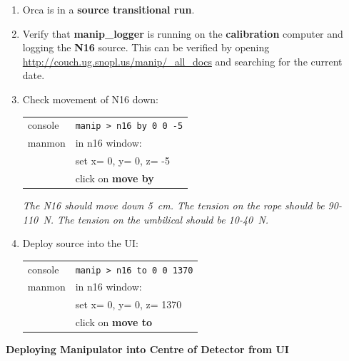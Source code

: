 \begin{enumerate}
\item \CheckBox[name=n16d12]{} Orca is in a {\bf source transitional run}.
\item \CheckBox[name=n16d13]{} Verify that {\bf manip\_logger} is running on the {\bf calibration} computer and logging the {\bf N16} source. This can be verified by opening \url{http://couch.ug.snopl.us/manip/_all_docs} and searching for the current date.
\item \CheckBox[name=n16d14]{} Check movement of N16 down:
	\begin{center}
	\begin{tabular}{|l|l|}
	\hline
	console & \verb+manip > n16 by 0 0 -5+ \\
	manmon & in n16 window: \\
	& set x= 0, y= 0, z= -5 \\
	& click on {\bf move by} \\
	\hline
	\end{tabular}
	\end{center}
{\it The N16 should move down 5~cm. The tension on the rope should be 90-110~N. The tension on the umbilical should be 10-40~N.}
\item \CheckBox[name=n16d15]{} Deploy source into the UI:
	\begin{center}
	\begin{tabular}{|l|l|}
	\hline
	console & \verb+manip > n16 to 0 0 1370+ \\
	manmon & in n16 window: \\
	& set x= 0, y= 0, z= 1370 \\
	& click on {\bf move to} \\
	\hline
	\end{tabular}
	\end{center}
\end{enumerate}

{\bf Deploying Manipulator into Centre of Detector from UI}
	
